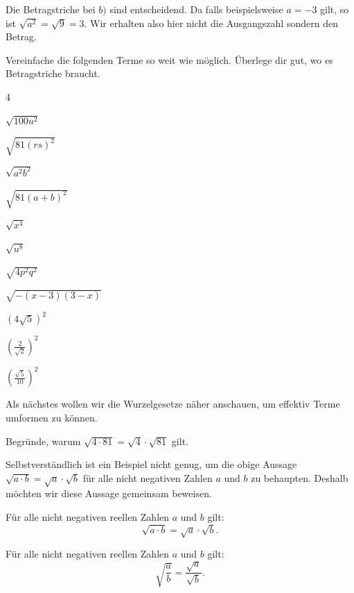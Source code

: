 \documentclass[11pt,oneside]{article}
\begin{document}
    Die Betragstriche bei $b)$ sind entscheidend. Da falls beispielsweise $a=-3$ gilt, so ist $\sqrt{a^2}=\sqrt{9}=3$. Wir erhalten also hier nicht die Ausgangszahl sondern den Betrag.\newpage
    \begin{aufgabe}
        Vereinfache die folgenden Terme so weit wie möglich. Überlege dir gut, wo es Betragstriche braucht.
        \begin{enumerate}[label=\alph*)]\begin{multicols}{4}
            \item $\sqrt{100u^2}$
            \item $\sqrt{81(rs)^2}$
            \item $\sqrt{a^2b^2}$
            \item $\sqrt{81(a+b)^2}$
            \item $\sqrt{x^4}$
            \item $\sqrt{u^8}$
            \item $\sqrt{4p^2q^2}$
            \item $\sqrt{-(x-3)(3-x)}$
            \item $\left(4\sqrt{5}\right)^2$
            \item $\left(\frac{2}{\sqrt{2}}\right)^2$
            \item $\left(\frac{\sqrt{5}}{10}\right)^2$
        \end{multicols}\end{enumerate}
    \end{aufgabe}
    Als nächstes wollen wir die Wurzelgesetze näher anschauen, um effektiv Terme umformen zu können.
    \begin{aufgabe}
        Begründe, warum $\sqrt{4\cdot 81} = \sqrt{4}\cdot\sqrt{81}$ gilt.\\[2pt]
    \end{aufgabe}
    Selbstverständlich ist ein Beispiel nicht genug, um die obige Aussage $\sqrt{a\cdot b}=\sqrt{a}\cdot\sqrt{b}$ für alle nicht negativen Zahlen $a$ und $b$ zu behaupten. Deshalb möchten wir diese Aussage gemeinsam beweisen.
    \begin{satz}\label{satz:wurzelgesetz}
        Für alle nicht negativen reellen Zahlen $a$ und $b$ gilt:
        \[\sqrt{a\cdot b}=\sqrt{a}\cdot\sqrt{b}.\]
    \end{satz}
    \begin{beweis}
    \end{beweis}
    \begin{satz}
         Für alle nicht negativen reellen Zahlen $a$ und $b$ gilt:
         \[\sqrt{\frac{a}{b}}=\frac{\sqrt{a}}{\sqrt{b}}.\]
    \end{satz}
\end{document}
